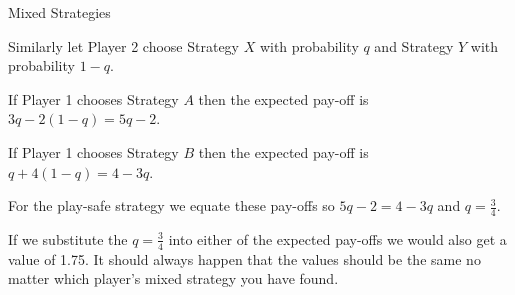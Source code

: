 \documentclass[8pt]{beamer}
\begin{document}
\begin{frame}[shrink=25]{Mixed Strategies}
\begin{solution}
	Similarly let Player 2 choose Strategy  $X$ with probability $q$ and Strategy $Y$ with probability $1-q $.

	If Player 1 chooses Strategy $A$ then the expected pay-off is $3q-2(1-q)=5q-2$.
 
	If Player 1 chooses Strategy  $B$ then the expected pay-off is $q+4(1-q)=4-3q$.

	For the play-safe strategy we equate these pay-offs so  $5q-2=4-3q$ and $q=\frac{3}{4}.$ 

	\alert<5>{If we substitute the $q=\frac{3}{4}$ into either of the expected pay-offs we would also get a value of 1.75. It should always happen that the values should be the same no matter which player's mixed strategy you have found.}
\end{solution}


\end{frame}
\end{document}
